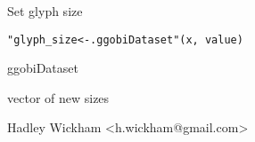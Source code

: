 \begin{Description}\relax
Set glyph size
\end{Description}
\begin{Usage}
\begin{verbatim}"glyph_size<-.ggobiDataset"(x, value)\end{verbatim}
\end{Usage}
\begin{Arguments}
\begin{ldescription}
\item[\code{x}] ggobiDataset
\item[\code{value}] vector of new sizes
\end{ldescription}
\end{Arguments}
\begin{Details}\relax
\end{Details}
\begin{Author}\relax
Hadley Wickham <h.wickham@gmail.com>
\end{Author}
\begin{SeeAlso}\relax
{}
\end{SeeAlso}
\begin{Examples}
\begin{ExampleCode}\end{ExampleCode}
\end{Examples}

